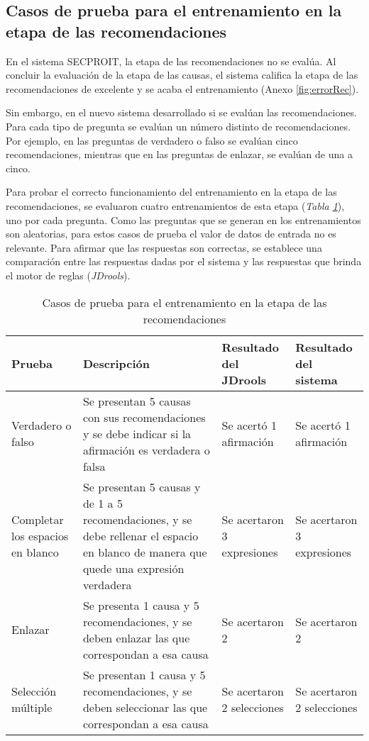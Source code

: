\subsection{Casos de prueba para el entrenamiento en la etapa de las recomendaciones}
En el sistema SECPROIT, la etapa de las recomendaciones no se evalúa. Al concluir la evaluación de la etapa de las causas, el sistema califica la etapa de las recomendaciones de excelente y se acaba el entrenamiento (Anexo \ref{fig:errorRec}).

Sin embargo, en el nuevo sistema desarrollado si se evalúan las recomendaciones. Para cada tipo de pregunta se evalúan un número distinto de recomendaciones. Por ejemplo, en las preguntas de verdadero o falso se evalúan cinco recomendaciones, mientras que en las preguntas de enlazar, se evalúan de una a cinco.

Para probar el correcto funcionamiento del entrenamiento en la etapa de las recomendaciones, se evaluaron cuatro entrenamientos de esta etapa (\textsl{Tabla \ref{cas:reco}}), uno por cada pregunta. Como las preguntas que se generan en los entrenamientos son aleatorias, para estos casos de prueba el valor de datos de entrada no es relevante. Para afirmar que las respuestas son correctas, se establece una comparación entre las respuestas dadas por el sistema y las respuestas que brinda el motor de reglas (\textsl{JDrools}).

\begin{table}[H]
\begin{center}
\begin{tabular}{ | p{2.7cm} | p{6.2cm} | p{2.6cm} | p{2.6cm} |}
\hline
\centering\textbf{Prueba} & \textbf{Descripción} & \textbf{Resultado del JDrools} & \textbf{Resultado del sistema} \\
\hline
Verdadero o \break falso & Se presentan 5 causas con sus recomendaciones y se debe indicar si la afirmación es verdadera o falsa & Se acertó 1 afirmación &  Se acertó 1 afirmación \\
\hline
Completar los espacios en blanco & Se presentan 5 causas y de 1 a 5 recomendaciones, y se debe rellenar el espacio en blanco de manera que quede una expresión verdadera & Se acertaron 3 expresiones &  Se acertaron 3 expresiones \\
\hline
Enlazar & Se presenta 1 causa y 5 recomendaciones, y se deben enlazar las que correspondan a esa causa & Se acertaron 2 &  Se acertaron 2 \\
\hline
Selección múltiple & Se presentan 1 causa y 5 recomendaciones, y se deben seleccionar las que correspondan a esa causa & Se acertaron 2 selecciones &  Se acertaron 2 selecciones \\
\hline
\end{tabular}
\caption{Casos de prueba para el entrenamiento en la etapa de las recomendaciones}
\label{cas:reco}
\end{center}
\end{table}

\section{}
